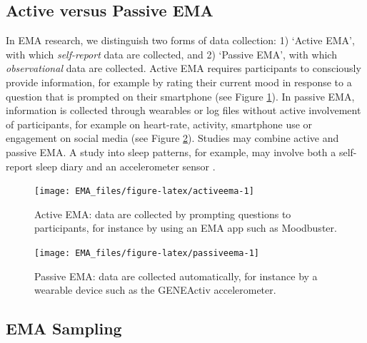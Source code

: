 \documentclass[]{book}
\begin{document}
\subsection{Active versus Passive EMA}\label{active-versus-passive-ema}

 
 

In EMA research, we distinguish two forms of data collection: 1) `Active
EMA', with which \emph{self-report} data are collected, and 2) `Passive
EMA', with which \emph{observational} data are collected. Active EMA
requires participants to consciously provide information, for example by
rating their current mood in response to a question that is prompted on
their smartphone (see Figure \ref{fig:activeema}). In passive EMA,
information is collected through wearables or log files without active
involvement of participants, for example on heart-rate, activity,
smartphone use or engagement on social media (see Figure
\ref{fig:passiveema}). Studies may combine active and passive EMA. A
study into sleep patterns, for example, may involve both a self-report
sleep diary and an accelerometer sensor \citep{Meijden2016}.

\begin{figure}

{\centering \texttt{[image: EMA\_files/figure-latex/activeema-1]} 

}

\caption{Active EMA: data are collected by prompting questions to participants, for instance by using an EMA app such as Moodbuster. }\label{fig:activeema}
\end{figure}

\begin{figure}

{\centering \texttt{[image: EMA\_files/figure-latex/passiveema-1]} 

}

\caption{Passive EMA: data are collected automatically, for instance by a wearable device such as the GENEActiv accelerometer.}\label{fig:passiveema}
\end{figure}

\subsection{EMA Sampling}\label{ema-sampling}

 
\end{document}
